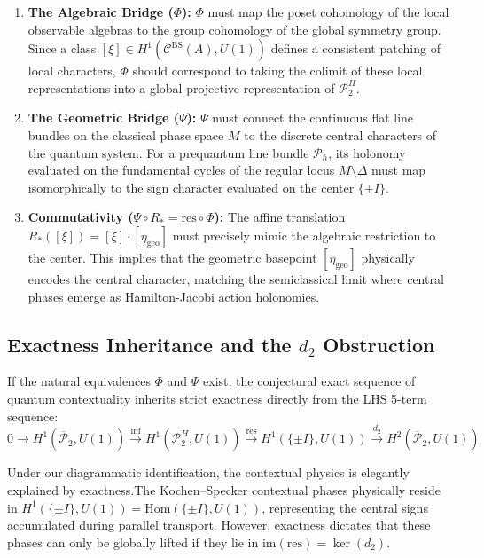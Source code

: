 \documentclass[11pt]{article}
\begin{document}
\begin{enumerate}
    \item \textbf{The Algebraic Bridge ($\Phi$):} $\Phi$ must map the poset cohomology of the local observable algebras to the group cohomology of the global symmetry group. Since a class $[\xi] \in H^1(\mathcal{C}^{\mathrm{BS}}(A), \underline{U(1)})$ defines a consistent patching of local characters, $\Phi$ should correspond to taking the colimit of these local representations into a global projective representation of $\mathcal{P}_2^H$.

    \item \textbf{The Geometric Bridge ($\Psi$):} $\Psi$ must connect the continuous flat line bundles on the classical phase space $M$ to the discrete central characters of the quantum system. For a prequantum line bundle $\mathcal{P}_\hbar$, its holonomy evaluated on the fundamental cycles of the regular locus $M \setminus \Delta$ must map isomorphically to the sign character evaluated on the center $\{\pm I\}$.

    \item \textbf{Commutativity ($\Psi \circ R_* = \mathrm{res} \circ \Phi$):} The affine translation $R_*([\xi]) = [\xi] \cdot [\eta_{\text{geo}}]$ must precisely mimic the algebraic restriction to the center. This implies that the geometric basepoint $[\eta_{\text{geo}}]$ physically encodes the central character, matching the semiclassical limit where central phases emerge as Hamilton-Jacobi action holonomies.
\end{enumerate}

\subsection{Exactness Inheritance and the $d_2$ Obstruction}

If the natural equivalences $\Phi$ and $\Psi$ exist, the conjectural exact sequence of quantum contextuality inherits strict exactness directly from the LHS 5-term sequence:
\[
    0 \longrightarrow H^1(\overline{\mathcal{P}}_2, U(1)) \overset{\mathrm{inf}}{\longrightarrow} H^1(\mathcal{P}_2^H, U(1)) \overset{\mathrm{res}}{\longrightarrow} H^1(\{\pm I\}, U(1)) \overset{d_2}{\longrightarrow} H^2(\overline{\mathcal{P}}_2, U(1))
\]

Under our diagrammatic identification, the contextual physics is elegantly explained by exactness.\linebreak The Kochen--Specker contextual phases physically reside in $H^1(\{\pm I\}, U(1)) = \mathrm{Hom}(\{\pm I\}, U(1))$, representing the central signs accumulated during parallel transport. However, exactness dictates that these phases can only be globally lifted if they lie in $\mathrm{im}(\mathrm{res}) = \ker(d_2)$.
\end{document}
